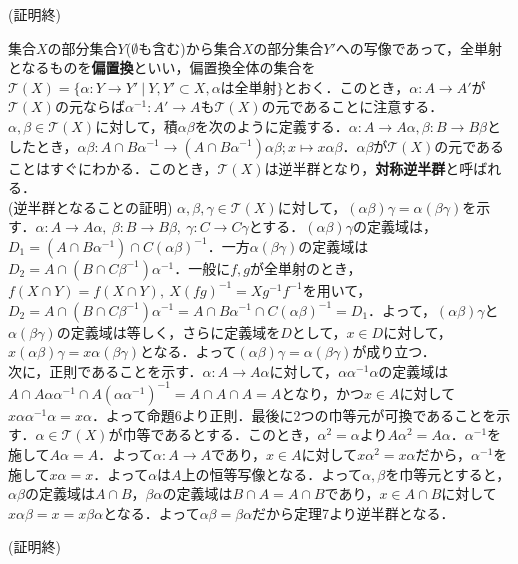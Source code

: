 \begin{flushright}
(証明終)
\end{flushright}
集合$X$の部分集合$Y$($\emptyset$も含む)から集合$X$の部分集合$Y'$への写像であって，全単射となるものを{\bf 偏置換}といい，偏置換全体の集合を${\mathscr T}(X)=\{\alpha:Y\rightarrow Y'\:|\:Y,Y'\subset X, \alpha は全単射\}$とおく．このとき，$\alpha:A\rightarrow A'$が${\mathscr T}(X)$の元ならば$\alpha^{-1}:A'\rightarrow A$も${\mathscr T}(X)$の元であることに注意する．$\alpha,\beta\in {\mathscr T}(X)$に対して，積$\alpha\beta$を次のように定義する．$\alpha:A\rightarrow A\alpha,\beta:B\rightarrow B\beta$としたとき，$\alpha\beta:A\cap B\alpha^{-1}\rightarrow (A\cap B\alpha^{-1})\alpha\beta;x\mapsto x\alpha\beta$．$\alpha\beta$が${\mathscr T}(X)$の元であることはすぐにわかる．このとき，${\mathscr T}(X)$は逆半群となり，{\bf 対称逆半群}と呼ばれる．\\
(逆半群となることの証明)
$\alpha,\beta,\gamma\in{\mathscr T}(X)$に対して，$(\alpha\beta)\gamma=\alpha(\beta\gamma)$を示す．$\alpha:A\rightarrow A\alpha,\:\beta:B\rightarrow B\beta,\:\gamma:C\rightarrow C\gamma$とする．$(\alpha\beta)\gamma$の定義域は，$D_1=(A\cap B\alpha^{-1})\cap C(\alpha\beta)^{-1}$．一方$\alpha(\beta\gamma)$の定義域は$D_2=A\cap(B\cap C\beta^{-1})\alpha^{-1}$．一般に$f,g$が全単射のとき，$f(X\cap Y)=f(X\cap Y),\:X(fg)^{-1}=Xg^{-1}f^{-1}$を用いて，$D_2=A\cap(B\cap C\beta^{-1})\alpha^{-1}=A\cap B\alpha^{-1}\cap C(\alpha\beta)^{-1}=D_1$．よって，$(\alpha\beta)\gamma$と$\alpha(\beta\gamma)$の定義域は等しく，さらに定義域を$D$として，$x\in D$に対して，$x(\alpha\beta)\gamma=x\alpha(\beta\gamma)$となる．よって$(\alpha\beta)\gamma=\alpha(\beta\gamma)$が成り立つ．\\
次に，正則であることを示す．$\alpha:A\rightarrow A\alpha$に対して，$\alpha\alpha^{-1}\alpha$の定義域は$A\cap A\alpha\alpha^{-1}\cap A(\alpha\alpha^{-1})^{-1}=A\cap A\cap A=A$となり，かつ$x\in A$に対して$x\alpha\alpha^{-1}\alpha=x\alpha$．よって命題6より正則．最後に2つの巾等元が可換であることを示す．$\alpha\in{\mathscr T}(X)$が巾等であるとする．このとき，$\alpha^2=\alpha$より$A\alpha^2=A\alpha$．$\alpha^{-1}$を施して$A\alpha=A$．よって$\alpha:A\rightarrow A$であり，$x\in A$に対して$x\alpha^2=x\alpha$だから，$\alpha^{-1}$を施して$x\alpha=x$．よって$\alpha$は$A$上の恒等写像となる．よって$\alpha,\beta$を巾等元とすると，$\alpha\beta$の定義域は$A\cap B$，$\beta\alpha$の定義域は$B\cap A=A\cap B$であり，$x\in A\cap B$に対して$x\alpha\beta=x=x\beta\alpha$となる．よって$\alpha\beta=\beta\alpha$だから定理7より逆半群となる．
\begin{flushright}
(証明終)
\end{flushright}
